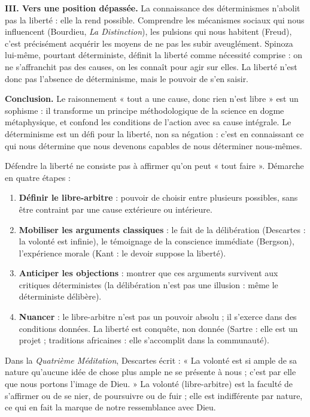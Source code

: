 \documentclass[11pt]{article}
\newcounter{popsec}
\newcounter{popsub}
\newcommand{\courssub}[1]{%
  \stepcounter{popsub}%
  \par\vspace{9pt}\noindent{\popxbold\fontsize{11.5}{13}\selectfont\color{popink}{\color{poporange}\thepopsec.\thepopsub}\hspace{6pt}#1}\par\nopagebreak\vspace{4pt}
}
\begin{document}
\begin{exoresolu}
\textbf{III. Vers une position dépassée.}
La connaissance des déterminismes n'abolit pas la liberté : elle la rend possible. Comprendre les mécanismes sociaux qui nous influencent (Bourdieu, \emph{La Distinction}), les pulsions qui nous habitent (Freud), c'est précisément acquérir les moyens de ne pas les subir aveuglément. Spinoza lui-même, pourtant déterministe, définit la liberté comme nécessité comprise : on ne s'affranchit pas des causes, on les connaît pour agir sur elles. La liberté n'est donc pas l'absence de déterminisme, mais le pouvoir de s'en saisir.

\textbf{Conclusion.} Le raisonnement « tout a une cause, donc rien n'est libre » est un sophisme : il transforme un principe méthodologique de la science en dogme métaphysique, et confond les conditions de l'action avec sa cause intégrale. Le déterminisme est un défi pour la liberté, non sa négation : c'est en connaissant ce qui nous détermine que nous devenons capables de nous déterminer nous-mêmes.
\end{exoresolu}

\courssub{Méthode 3 : Défendre le libre-arbitre sans naïveté}

\begin{methode}
Défendre la liberté ne consiste pas à affirmer qu'on peut « tout faire ». Démarche en quatre étapes :
\begin{enumerate}
\item \textbf{Définir le libre-arbitre} : pouvoir de choisir entre plusieurs possibles, sans être contraint par une cause extérieure ou intérieure.
\item \textbf{Mobiliser les arguments classiques} : le fait de la délibération (Descartes : la volonté est infinie), le témoignage de la conscience immédiate (Bergson), l'expérience morale (Kant : le devoir suppose la liberté).
\item \textbf{Anticiper les objections} : montrer que ces arguments survivent aux critiques déterministes (la délibération n'est pas une illusion : même le déterministe délibère).
\item \textbf{Nuancer} : le libre-arbitre n'est pas un pouvoir absolu ; il s'exerce dans des conditions données. La liberté est conquête, non donnée (Sartre : elle est un projet ; traditions africaines : elle s'accomplit dans la communauté).
\end{enumerate}
\end{methode}

\begin{propriete}
Dans la \emph{Quatrième Méditation}, Descartes écrit : « La volonté est si ample de sa nature qu'aucune idée de chose plus ample ne se présente à nous ; c'est par elle que nous portons l'image de Dieu. » La volonté (libre-arbitre) est la faculté de s'affirmer ou de se nier, de poursuivre ou de fuir ; elle est indifférente par nature, ce qui en fait la marque de notre ressemblance avec Dieu.
\end{propriete}
\end{document}
